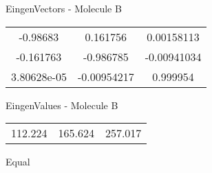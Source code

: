 \begin{multicols}{2}
\begin{center}
\vtab
 EingenVectors - Molecule B     \\
\vtab
\begin{tabular}{|c c c|}
-0.98683	 & 	0.161756	 & 	0.00158113	 \\
-0.161763	 & 	-0.986785	 & 	-0.00941034	 \\
3.80628e-05	 & 	-0.00954217	 & 	0.999954
\end{tabular}

\vtab
 EingenValues - Molecule B     \\
\vtab
\begin{tabular}{|c c c|}
112.224	 & 	165.624	 & 	257.017	 \\
\end{tabular}

\end{center}
\end{multicols}
\begin{center}
\vtab
\vtab
\textcolor{NavyBlue}{\Large Equal}
\end{center}

 \newpage


